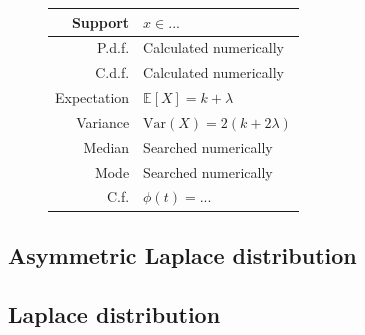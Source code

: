 \documentclass[a4paper,11pt]{article}
\theoremstyle{plain}
\theoremstyle{definition}
\newcommand{\ME}{\mathbb{E}}
\newcommand{\Var}{\mathrm{Var}}
\begin{document}
\begin{figure}[!htb]
\begin{minipage}{0.4\textwidth}
\begin{tabular}{| r | l |}
				\hline
				Support & $x \in ...$  \\
				\hline
				P.d.f. & Calculated numerically \\
				\hline
				C.d.f. & Calculated numerically \\
				\hline
				Expectation & $\ME[X] = k + \lambda$ \\
				\hline
				Variance & $\Var(X) =2(k+2\lambda)$ \\
				\hline
				Median & Searched numerically \\
				\hline
				Mode & Searched numerically \\
				\hline
				C.f. & $\phi(t) = ...$ \\
				\hline
			\end{tabular}
		\end{minipage}
	\end{figure}
	
	\subsection{Asymmetric Laplace distribution}

	\subsection{Laplace distribution}
	
\end{document}

